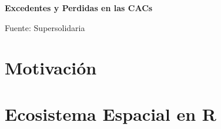 \documentclass{beamer}
\begin{document}
\begin{frame}{\textbf{Excedentes y Perdidas en las CACs}}
\begin{center}
\end{center}
\scriptsize Fuente: Supersolidaria
\end{frame}

\section{Motivación}
\section{Ecosistema Espacial en R}
\begin{frame}[noframenumbering]
\tableofcontents[currentsection]
\end{frame}
\end{document}
